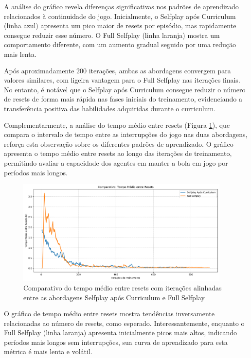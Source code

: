 A análise do gráfico revela diferenças significativas nos padrões de aprendizado relacionados à continuidade do jogo. Inicialmente, o Selfplay após Curriculum (linha azul) apresenta um pico maior de resets por episódio, mas rapidamente consegue reduzir esse número. O Full Selfplay (linha laranja) mostra um comportamento diferente, com um aumento gradual seguido por uma redução mais lenta.

Após aproximadamente 200 iterações, ambas as abordagens convergem para valores similares, com ligeira vantagem para o Full Selfplay nas iterações finais. No entanto, é notável que o Selfplay após Curriculum consegue reduzir o número de resets de forma mais rápida nas fases iniciais do treinamento, evidenciando a transferência positiva das habilidades adquiridas durante o curriculum.

Complementarmente, a análise do tempo médio entre resets (Figura \ref{fig:time_between_resets}), que compara o intervalo de tempo entre as interrupções do jogo nas duas abordagens, reforça esta observação sobre os diferentes padrões de aprendizado. O gráfico apresenta o tempo médio entre resets ao longo das iterações de treinamento, permitindo avaliar a capacidade dos agentes em manter a bola em jogo por períodos mais longos.

\begin{figure}[H]
    \centering
    \includegraphics[width=0.95\textwidth]{fig/graficos_trabalho/graficos_experimentos/geral/comparativo_tempo_entre_resets.png}
    \caption{Comparativo do tempo médio entre resets com iterações alinhadas entre as abordagens Selfplay após Curriculum e Full Selfplay}
    \label{fig:time_between_resets}
\end{figure}

O gráfico de tempo médio entre resets mostra tendências inversamente relacionadas ao número de resets, como esperado. Interessantemente, enquanto o Full Selfplay (linha laranja) apresenta inicialmente picos mais altos, indicando períodos mais longos sem interrupções, sua curva de aprendizado para esta métrica é mais lenta e volátil.

